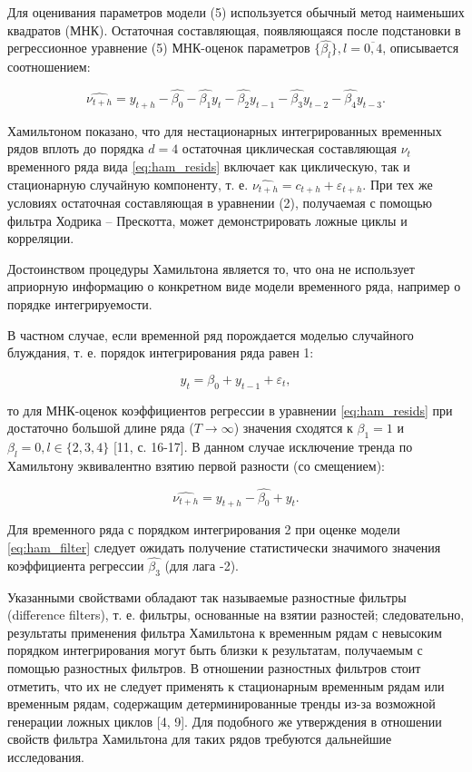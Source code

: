 \documentclass[a4paper,14pt]{extreport}
\begin{document}
	Для оценивания параметров модели (5) используется обычный метод наименьших квадратов (МНК). Остаточная составляющая, появляющаяся после подстановки в регрессионное уравнение (5) МНК-оценок параметров $\{\hat{\beta_l}\}, l=\overline{0,4}$, описывается соотношением:

	\begin{equation}
	\hat{\nu_{t+h}} = y_{t+h} - \hat{\beta_0} - \hat{\beta_1} y_t 
	- \hat{\beta_2} y_{t-1} - \hat{\beta_3} y_{t-2} - \hat{\beta_4} y_{t-3} .
	\label{eq:ham_resids}
	\end{equation}	
	
	Хамильтоном показано, что для нестационарных интегрированных временных рядов вплоть до порядка $d=4$ остаточная циклическая составляющая $\nu_t$ временного ряда вида \ref{eq:ham_resids} включает как циклическую, так и стационарную случайную компоненту, т. е. $\hat{\nu_{t+h}}=c_{t+h} + \varepsilon_{t+h}$. При тех же условиях остаточная составляющая в уравнении (2), получаемая с помощью фильтра Ходрика – Прескотта, может демонстрировать ложные циклы и корреляции. 
	
	Достоинством процедуры Хамильтона является то, что она не использует априорную информацию о конкретном виде модели временного ряда, например о порядке интегрируемости. 
	
	В частном случае, если временной ряд порождается моделью случайного блуждания, т. е. порядок интегрирования ряда равен 1: 
	
	\begin{equation}
	y_t = \beta_0 + y_{t-1} + \varepsilon_t ,
	\label{eq:ham_unitroot}
	\end{equation}
	
	то для МНК-оценок коэффициентов регрессии в уравнении \ref{eq:ham_resids} при достаточно большой длине ряда ($T \rightarrow \infty$) значения сходятся к $\beta_1 = 1$ и $\beta_l = 0, l \in \{2, 3, 4\}$ [11, с. 16-17]. В данном случае исключение тренда по Хамильтону эквивалентно взятию первой разности (со смещением):
	
	\begin{equation}
	\hat{\nu_{t+h}} = y_{t+h} - \hat{\beta_0} + y_{t} .
	\label{eq:ham_unitroot_resid}
	\end{equation}
	
	Для временного ряда с порядком интегрирования 2 при оценке модели \ref{eq:ham_filter} следует ожидать получение статистически значимого значения коэффициента регрессии $\hat{\beta_3}$  (для лага -2).  
	
	Указанными свойствами обладают так называемые разностные фильтры (difference filters), т. е. фильтры, основанные на взятии разностей; следовательно, результаты применения фильтра Хамильтона к временным рядам с невысоким порядком интегрирования могут быть близки к результатам, получаемым с помощью разностных фильтров. В отношении разностных фильтров стоит отметить, что их не следует применять к стационарным временным рядам или временным рядам, содержащим детерминированные тренды из-за возможной генерации ложных циклов [4, 9]. Для подобного же утверждения в отношении свойств фильтра Хамильтона для таких рядов требуются дальнейшие исследования. 
	
\end{document}
